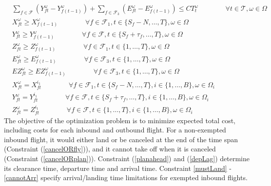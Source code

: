\documentclass[12pt]{article}
\begin{document}
\begin{align}
		& \sum_{f \in \mathcal{F}}\left(Y_{ft}^\omega - Y_{f(t-1)}^\omega\right) + \sum_{f \in \mathcal{F}_3}\left(E_{ft}^\omega - E_{f(t-1)}^\omega\right) \leq CT_t^\omega \qquad \qquad \forall t \in \mathcal{T}, \omega \in \Omega \\
		& X_{ft}^\omega \geq X_{f(t-1)}^\omega \qquad \qquad \forall f \in \mathcal{F}_1, t \in \{S_f - N, \dots, T\}, \omega \in \Omega\\
		& Y_{ft}^\omega \geq Y_{f(t-1)}^\omega \qquad \qquad \forall f \in \mathcal{F}, t \in \{S_f + \tau_f, \dots, T\}, \omega \in \Omega\\
		& Z_{ft}^\omega \geq Z_{f(t-1)}^\omega \qquad \qquad \forall f \in \mathcal{F}_1, t \in \{1, \dots, T\}, \omega \in \Omega\\
		& E_{ft}^\omega \geq E_{f(t-1)}^\omega \qquad \qquad \forall f \in \mathcal{F}_3, t \in \{1, \dots, T\}, \omega \in \Omega\\
		& EZ_{ft}^\omega \geq EZ_{f(t-1)}^\omega \qquad \qquad \forall f \in \mathcal{F}_3, t \in \{1, \dots, T\}, \omega \in \Omega\\
		& X_{ft}^\omega = X_{ft}^{i_1} \qquad \qquad \forall f \in \mathcal{F}_1, t \in \{S_f - N, \dots, T\}, i \in \{1, \dots, B\}, \omega \in \Omega_i\\
		& Y_{ft}^\omega = Y_{ft}^{i_1} \qquad \qquad \forall f \in \mathcal{F}, t \in \{S_f + \tau_f, \dots, T\}, i \in \{1, \dots, B\}, \omega \in \Omega_i\\
		& Z_{ft}^\omega = Z_{ft}^{i_1} \qquad \qquad \forall f \in \mathcal{F}, t \in \{1, \dots, T\}, i \in \{1, \dots, B\}, \omega \in \Omega_i
	\end{align}
	The objective of the optimization problem is to minimize expected total cost, including costs for each inbound and outbound flight. For a non-exempted inbound flight, it would either land or be canceled at the end of the time span (Constraint (\ref{cancelORfly})), and it cannot take off when it is canceled (Constraint (\ref{cancelORplan})). Constraint (\ref{planahead}) and (\ref{depLag}) determine its clearance time, departure time and arrival time. Constraint \ref{mustLand} - \ref{cannotArr} specify arrival/landing time limitations for exempted inbound flights.
	
\end{document}
